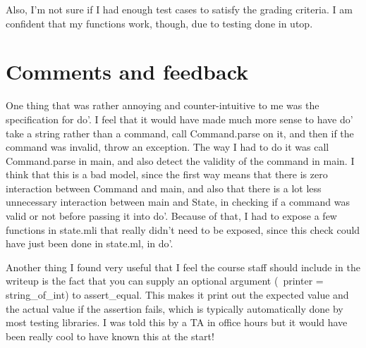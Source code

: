 Also, I'm not sure if I had enough test cases to satisfy the grading criteria. I am confident that my functions work, though, due to testing done in utop.

\section{Comments and feedback}
One thing that was rather annoying and counter-intuitive to me was the specification for do'. I feel that it would have made much more sense to have do' take a string rather than a command, call Command.parse on it, and then if the command was invalid, throw an exception. The way I had to do it was call Command.parse in main, and also detect the validity of the command in main. I think that this is a bad model, since the first way means that there is zero interaction between Command and main, and also that there is a lot less unnecessary interaction between main and State, in checking if a command was valid or not before passing it into do'. Because of that, I had to expose a few functions in state.mli that really didn't need to be exposed, since this check could have just been done in state.ml, in do'.

Another thing I found very useful that I feel the course staff should include in the writeup is the fact that you can supply an optional argument (~printer = string\_of\_int) to assert\_equal. This makes it print out the expected value and the actual value if the assertion fails, which is typically automatically done by most testing libraries. I was told this by a TA in office hours but it would have been really cool to have known this at the start!


